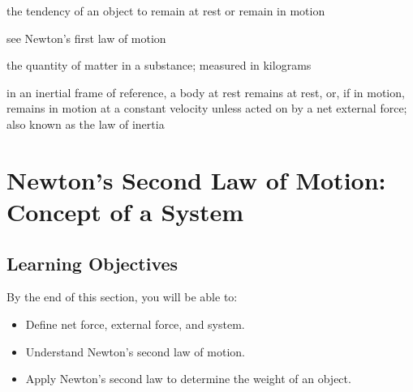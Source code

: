 \documentclass[
]{book}
\providecommand{\tightlist}{%
  \setlength{\itemsep}{0pt}\setlength{\parskip}{0pt}}
\newenvironment{learning-objectives}{}{}
\begin{document}
\begin{description}
\tightlist
\item[inertia]
the tendency of an object to remain at rest or remain in motion
\end{description}

\begin{description}
\tightlist
\item[law of inertia]
see Newton's first law of motion
\end{description}

\begin{description}
\tightlist
\item[mass]
the quantity of matter in a substance; measured in kilograms
\end{description}

\begin{description}
\tightlist
\item[Newton's first law of motion]
in an inertial frame of reference, a body at rest remains at rest,
or, if in motion, remains in motion at a constant velocity unless
acted on by a net external force; also known as the law of inertia
\end{description}

\hypertarget{newtons-second-law-of-motion-concept-of-a-system}{%
\section{Newton's Second Law of Motion: Concept of a System}\label{newtons-second-law-of-motion-concept-of-a-system}}

\hypertarget{fs-id1899128}{}
\begin{learning-objectives}

\hypertarget{learning-objectives-15}{%
\subsection{Learning Objectives}\label{learning-objectives-15}}

By the end of this section, you will be able to:

\begin{itemize}
\tightlist
\item
  Define net force, external force, and system.
\item
  Understand Newton's second law of motion.
\item
  Apply Newton's second law to determine the weight of an object.
\end{itemize}

\end{learning-objectives}
\end{document}
